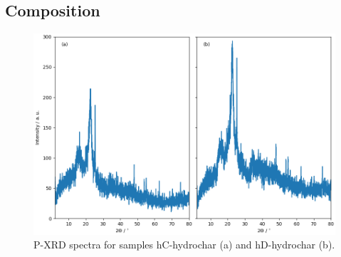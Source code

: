 \begin{appendices}

\chapter{Composition}

\newpage
\begin{figure}[h]
    \centering
    \includegraphics[width=\columnwidth, keepaspectratio]{4-cbs/figs/xrd_hydrochar.png}
    \caption{P-XRD spectra for samples hC-hydrochar (a) and hD-hydrochar (b).}
    \label{fig:xrd_hydrochar}
\end{figure}


\end{appendices}
